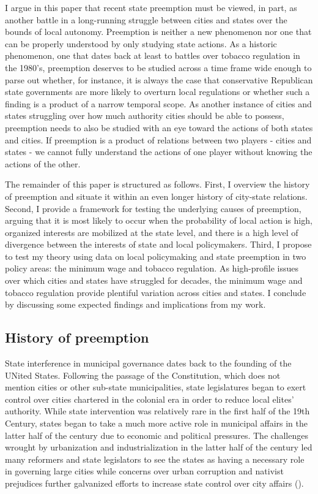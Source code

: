 \documentclass[12pt]{article}
\begin{document}
I argue in this paper that recent state preemption must be viewed, in part, as another battle in a long-running struggle between cities and states over the bounds of local autonomy. Preemption is neither a new phenomenon nor one that can be properly understood by only studying state actions. As a historic phenomenon, one that dates back at least to battles over tobacco regulation in the 1980's, preemption deserves to be studied across a time frame wide enough to parse out whether, for instance, it is always the case that conservative Republican state governments are more likely to overturn local regulations or whether such a finding is a product of a narrow temporal scope. As another instance of cities and states struggling over how much authority cities should be able to possess, preemption needs to also be studied with an eye toward the actions of both states and cities. If preemption is a product of relations between two players - cities and states - we cannot fully understand the actions of one player without knowing the actions of the other.

The remainder of this paper is structured as follows. First, I overview the history of preemption and situate it within an even longer history of city-state relations. Second, I provide a framework for testing the underlying causes of preemption, arguing that it is most likely to occur when the probability of local action is high, organized interests are mobilized at the state level, and there is a high level of divergence between the interests of state and local policymakers. Third, I propose to test my theory using data on local policymaking and state preemption in two policy areas: the minimum wage and tobacco regulation. As high-profile issues over which cities and states have struggled for decades, the minimum wage and tobacco regulation provide plentiful variation across cities and states. I conclude by discussing some expected findings and implications from my work. 

\subsection*{History of preemption}
State interference in municipal governance dates back to the founding of the UNited States. Following the passage of the Constitution, which does not mention cities or other sub-state municipalities, state legislatures began to exert control over cities chartered in the colonial era in order to reduce local elites' authority. While state intervention was relatively rare in the first half of the 19th Century, states began to take a much more active role in municipal affairs in the latter half of the century due to economic and political pressures. The challenges wrought by urbanization and industrialization in the latter half of the century led many reformers and state legislators to see the states as having a necessary role in governing large cities while concerns over urban corruption and nativist prejudices further galvanized efforts to increase state control over city affairs (\cites[p. 53-57]{bermanLocalGovernmentStates2003}[p. 9]{kraneHomeRuleAmerica2000}). 
\end{document}

